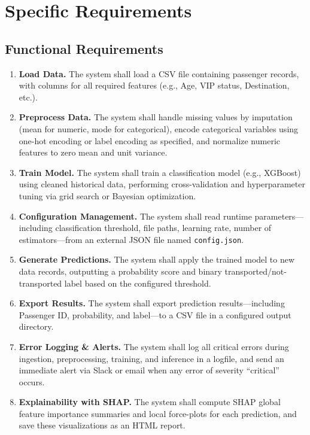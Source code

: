 \documentclass[15pt]{article}
\begin{document}
\section{Specific Requirements}

\subsection{Functional Requirements}

\begin{enumerate}[label=\textbf{FR\arabic*:}, leftmargin=3em]
  \item \textbf{Load Data.} The system shall load a CSV file containing passenger records, with columns for all required features (e.g., Age, VIP status, Destination, etc.).
  \item \textbf{Preprocess Data.} The system shall handle missing values by imputation (mean for numeric, mode for categorical), encode categorical variables using one-hot encoding or label encoding as specified, and normalize numeric features to zero mean and unit variance.
  \item \textbf{Train Model.} The system shall train a classification model (e.g., XGBoost) using cleaned historical data, performing cross-validation and hyperparameter tuning via grid search or Bayesian optimization.
  \item \textbf{Configuration Management.} The system shall read runtime parameters—including classification threshold, file paths, learning rate, number of estimators—from an external JSON file named \texttt{config.json}.
  \item \textbf{Generate Predictions.} The system shall apply the trained model to new data records, outputting a probability score and binary transported/not-transported label based on the configured threshold.
  \item \textbf{Export Results.} The system shall export prediction results—including Passenger ID, probability, and label—to a CSV file in a configured output directory.
  \item \textbf{Error Logging \& Alerts.} The system shall log all critical errors during ingestion, preprocessing, training, and inference in a logfile, and send an immediate alert via Slack or email when any error of severity “critical” occurs.
  \item \textbf{Explainability with SHAP.} The system shall compute SHAP global feature importance summaries and local force-plots for each prediction, and save these visualizations as an HTML report.

\end{enumerate}
\end{document}
